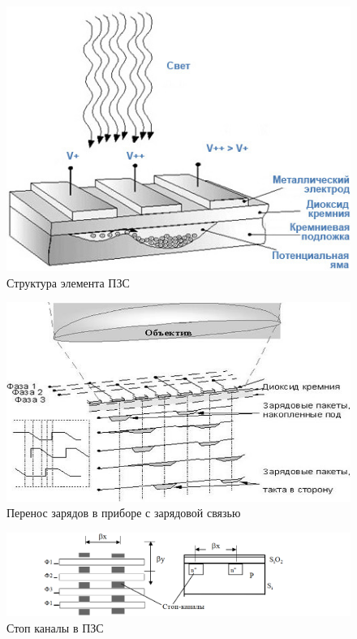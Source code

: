 	\newpage
	\vspace{-1em}
	\begin{figure}[H]
		\centering
		\begin{minipage}[t]{0.48\linewidth}
			\centering
			\includegraphics[width=\linewidth, height=0.2\textheight]{img/04_01}
			{\small Структура элемента ПЗС}
		\end{minipage}%
		\hfill
		\begin{minipage}[t]{0.48\linewidth}
			\centering
			\includegraphics[width=\linewidth, height=0.2\textheight]{img/04_02}
			{\small Перенос зарядов в приборе с зарядовой связью}
		\end{minipage}
		\label{fig:04_combined}
	\end{figure}
	\vspace{-2em}
	\begin{figure}[H]
		\centering
		\includegraphics[width=1\linewidth, height=0.1\textheight]{img/04_04}
		{\small Стоп каналы в ПЗС}
		\label{fig:04_04}
	\end{figure}
	\vspace{-2em}
